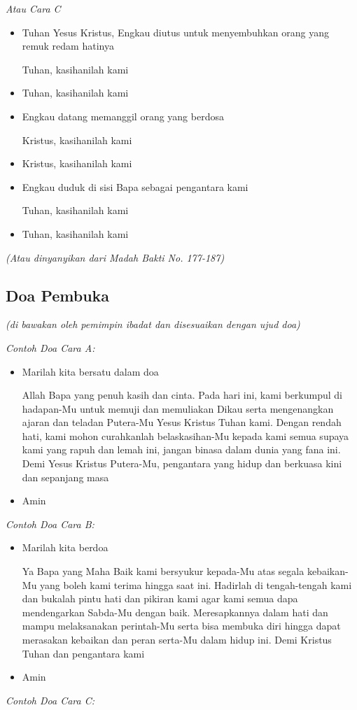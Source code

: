 \documentclass[a4paper,12pt]{article}
\newcommand{\BU}[1]{\begin{itemize} \item[U:] #1 \end{itemize}}
\newcommand{\BP}[1]{\begin{itemize} \item[P:] #1 \end{itemize}}
\begin{document}
\textit{Atau Cara C}

\BP{Tuhan Yesus Kristus, Engkau diutus untuk menyembuhkan orang yang remuk redam hatinya

Tuhan, kasihanilah kami}

\BU{Tuhan, kasihanilah kami}

\BP{Engkau datang memanggil orang yang berdosa

Kristus, kasihanilah kami}

\BU{Kristus, kasihanilah kami}

\BP{Engkau duduk di sisi Bapa sebagai pengantara kami

Tuhan, kasihanilah kami}

\BU{Tuhan, kasihanilah kami}

\textit{(Atau dinyanyikan dari Madah Bakti No. 177-187)}


\subsection*{Doa Pembuka}

\textit{(di bawakan oleh pemimpin ibadat dan disesuaikan dengan ujud doa)}

\textit{Contoh Doa Cara A:}

\BP{Marilah kita bersatu dalam doa

Allah Bapa yang penuh kasih dan cinta. Pada hari ini, kami berkumpul di hadapan-Mu untuk memuji dan memuliakan Dikau
serta mengenangkan ajaran dan teladan Putera-Mu Yesus Kristus Tuhan kami. Dengan rendah hati, kami mohon curahkanlah
belaskasihan-Mu kepada kami semua supaya kami yang rapuh dan lemah ini, jangan binasa dalam dunia yang fana ini. Demi
Yesus Kristus Putera-Mu, pengantara yang hidup dan berkuasa kini dan sepanjang masa}

\BU{Amin}

\textit{Contoh Doa Cara B:}

\BP{Marilah kita berdoa

Ya Bapa yang Maha Baik kami bersyukur kepada-Mu atas segala kebaikan-Mu yang boleh kami terima hingga saat ini. Hadirlah
di tengah-tengah kami dan bukalah pintu hati dan pikiran kami agar kami semua dapa mendengarkan Sabda-Mu dengan baik.
Meresapkannya dalam hati dan mampu melaksanakan perintah-Mu serta bisa membuka diri hingga dapat merasakan kebaikan dan
peran serta-Mu dalam hidup ini. Demi Kristus Tuhan dan pengantara kami}

\BU{Amin}

\textit{Contoh Doa Cara C:}
\end{document}

